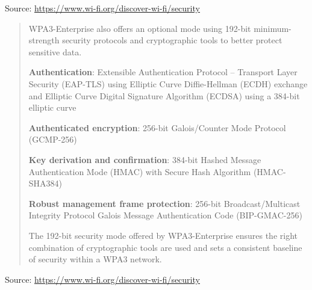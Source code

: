 \documentclass[Screen16to9,17pt]{foils}
\begin{document}
Source: \url{https://www.wi-fi.org/discover-wi-fi/security}



\begin{quote}

WPA3-Enterprise also offers an optional mode using 192-bit minimum-strength security protocols and cryptographic tools to better protect sensitive data.

\begin{list2}
\item {\bf Authentication}: Extensible Authentication Protocol – Transport Layer Security (EAP-TLS) using Elliptic Curve Diffie-Hellman (ECDH) exchange and Elliptic Curve Digital Signature Algorithm (ECDSA) using a 384-bit elliptic curve
\item {\bf Authenticated encryption}: 256-bit Galois/Counter Mode Protocol (GCMP-256)
\item {\bf Key derivation and confirmation}: 384-bit Hashed Message Authentication Mode (HMAC) with Secure Hash Algorithm (HMAC-SHA384)
\item {\bf Robust management frame protection}: 256-bit Broadcast/Multicast Integrity Protocol Galois Message Authentication Code (BIP-GMAC-256)
\end{list2}
The 192-bit security mode offered by WPA3-Enterprise ensures the right combination of cryptographic tools are used and sets a consistent baseline of security within a WPA3 network.
\end{quote}

Source: \url{https://www.wi-fi.org/discover-wi-fi/security}
\end{document}
